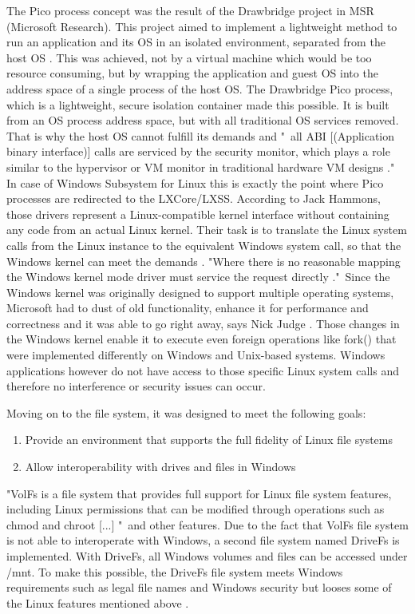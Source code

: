 \documentclass[utf8,biblatex, ngerman, english]{lni}
\begin{document}
The Pico process concept was the result of the Drawbridge project in MSR (Microsoft Research). This project aimed to implement a lightweight method to run an application and its OS in an isolated environment, separated from the host OS \cite{Ha16a}. This was achieved, not by a virtual machine which would be too resource consuming, but by wrapping the application and guest OS into the address space of a single process of the host OS. The Drawbridge Pico process, which is a lightweight, secure isolation container made this possible. It is built from an OS process address space, but with all traditional OS services removed. That is why the host OS cannot fulfill its demands and "\ all ABI [(Application binary interface)] calls are serviced by the security monitor, which plays a role similar to the hypervisor or VM monitor in traditional hardware VM designs \cite{11}."\\
In case of Windows Subsystem for Linux this is exactly the point where Pico processes are redirected to the LXCore/LXSS. 
According to Jack Hammons, those drivers represent a Linux-compatible kernel interface without containing any code from an actual Linux kernel. Their task is to translate the Linux system calls from the Linux instance to the equivalent Windows system call, so that the Windows kernel can meet the demands \cite{Ha16b}. 
"Where there is no reasonable mapping the Windows kernel mode driver must service the request directly \cite{Ha16b}."\ Since the Windows kernel was originally designed to support multiple operating systems, Microsoft had to dust of old functionality, enhance it for performance and correctness and it was able to go right away, says Nick Judge \cite{Ha16a}. Those changes in the Windows kernel enable it to execute even foreign operations like fork() that were implemented differently on Windows and Unix-based systems. Windows applications however do not have access to those specific Linux system calls and therefore no interference or security issues can occur.

Moving on to the file system, it was designed to meet the following goals:
\begin{enumerate}
    \item Provide an environment that supports the full fidelity of Linux file systems
    \item Allow interoperability with drives and files in Windows 
\end{enumerate} \cite{Ha16b}

"VolFs is a file system that provides full support for Linux file system features, including Linux permissions that can be modified through operations such as chmod and chroot [...] \cite{Ha16b}"\ and other features. Due to the fact that VolFs file system is not able to interoperate with Windows, a second file system named DriveFs is implemented. With DriveFs, all Windows volumes and files can be accessed under /mnt. To make this possible, the DriveFs file system meets Windows requirements such as legal file names and Windows security but looses some of the Linux features mentioned above \cite{Ha16b}.
\end{document}
